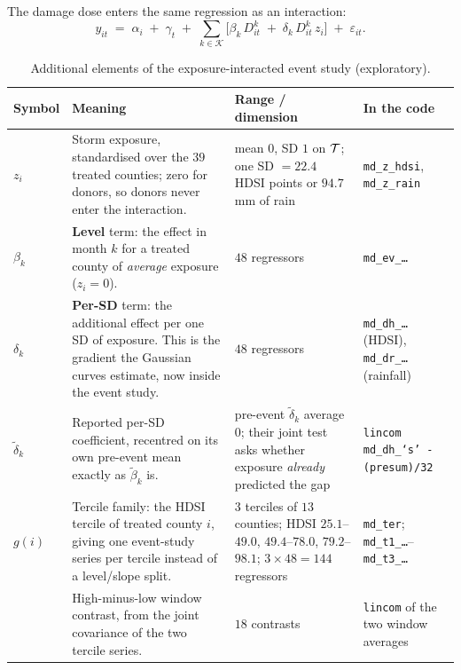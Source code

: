 \begin{table}[htbp]
\centering
\caption{Additional elements of the exposure-interacted event study (exploratory).}
\label{tab:dose-notation}
\begin{minipage}{\textwidth}\centering\small
The damage dose enters the same regression as an interaction:
\[
y_{it}\;=\;\alpha_i\;+\;\gamma_t\;+\;\sum_{k\in\mathcal{K}}\Big[\beta_k\,D^{k}_{it}\;+\;\delta_k\,D^{k}_{it}\,z_i\Big]\;+\;\varepsilon_{it}.
\]
\end{minipage}
\vspace{4pt}

\footnotesize
\setlength{\tabcolsep}{4pt}
\renewcommand{\arraystretch}{1.12}
\begin{tabular}{@{}l>{\raggedright}p{5.4cm}>{\raggedright}p{3.9cm}>{\raggedright\arraybackslash}p{3.7cm}@{}}
\toprule
\textbf{Symbol} & \textbf{Meaning} & \textbf{Range / dimension} & \textbf{In the code}\\
\midrule
$z_i$ & Storm exposure, standardised over the $39$ treated counties; zero for donors, so donors never enter the interaction. & mean $0$, SD $1$ on $\mathcal{T}$; one SD $=22.4$ HDSI points or $94.7$\,mm of rain & \texttt{md\_z\_hdsi}, \texttt{md\_z\_rain}\\
$\beta_k$ & \textbf{Level} term: the effect in month $k$ for a treated county of \emph{average} exposure ($z_i=0$). & $48$ regressors & \texttt{md\_ev\_\dots}\\
$\delta_k$ & \textbf{Per-SD} term: the additional effect per one SD of exposure. This is the gradient the Gaussian curves estimate, now inside the event study. & $48$ regressors & \texttt{md\_dh\_\dots} (HDSI), \texttt{md\_dr\_\dots} (rainfall)\\
$\tilde\delta_k$ & Reported per-SD coefficient, recentred on its own pre-event mean exactly as $\tilde\beta_k$ is. & pre-event $\tilde\delta_k$ average $0$; their joint test asks whether exposure \emph{already} predicted the gap & \texttt{lincom md\_dh\_`s' - (presum)/32}\\
$g(i)$ & Tercile family: the HDSI tercile of treated county $i$, giving one event-study series per tercile instead of a level/slope split. & $3$ terciles of $13$ counties; HDSI $25.1$--$49.0$, $49.4$--$78.0$, $79.2$--$98.1$; $3\times48=144$ regressors & \texttt{md\_ter}; \texttt{md\_t1\_\dots}--\texttt{md\_t3\_\dots}\\
 & High-minus-low window contrast, from the joint covariance of the two tercile series. & $18$ contrasts & \texttt{lincom} of the two window averages\\
\bottomrule
\end{tabular}


\end{table}
